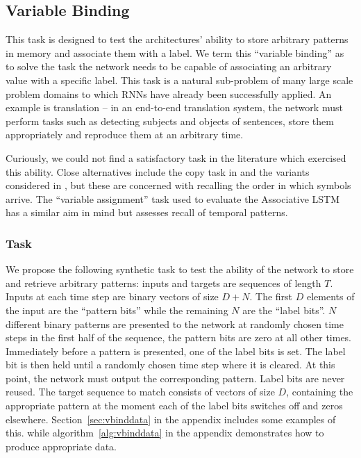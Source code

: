 \subsection{Variable Binding}
This task is designed to test the architectures' ability to store arbitrary patterns in memory and
associate them with a label. We term this ``variable binding'' as to solve the task the network needs
to be capable of associating an arbitrary value with a specific label. This task is a natural
sub-problem of many large scale problem domains to which RNNs have already been successfully applied.
An example is translation -- in an end-to-end translation system, the network must perform tasks such
as detecting subjects and objects of sentences, store them appropriately and reproduce them at an
arbitrary time.

Curiously, we could
not find a satisfactory task in the literature which exercised this ability.
Close alternatives include
the copy task in \autocite{Hochreiter1997} and the variants considered in \autocite{Graves2014}, but these
are concerned with recalling the order in which symbols arrive. The ``variable assignment'' task
used to evaluate the Associative LSTM \autocite{Danihelka2016} has a similar aim in mind but assesses recall
of temporal patterns.


\subsubsection{Task}
We propose the following synthetic task to test the ability of the network to store and retrieve
arbitrary patterns: inputs and targets are sequences of length \(T\). Inputs at each time step are
binary vectors of size \(D+N\). The first \(D\) elements of the input are the ``pattern bits'' while
the remaining \(N\) are the ``label bits''. \(N\) different binary patterns are presented to the
network at randomly chosen time steps in the first half of the sequence, the pattern bits are zero at
all other times. Immediately before a pattern is presented, one of the label bits is set. The label
bit is then held until a randomly chosen time step where it is cleared.
At this point, the network must output the corresponding pattern. Label bits are never reused. The target
sequence to match consists of vectors of size \(D\), containing the appropriate pattern at the moment each
of the label bits switches off and zeros elsewhere. Section~\ref{sec:vbinddata} in the appendix includes
some examples of this.
while algorithm~\ref{alg:vbinddata} in the appendix demonstrates how to produce appropriate data.

